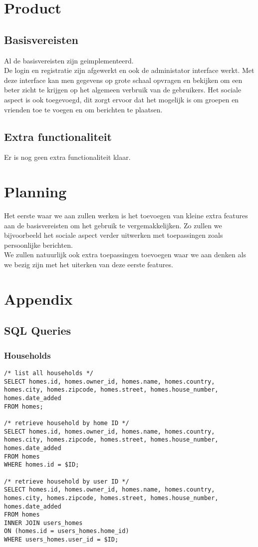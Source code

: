 \documentclass[11pt]{article}
\begin{document}
\section{Product}
  \subsection{Basisvereisten}
  Al de basisvereisten zijn geimplementeerd.\\
  De login en registratie zijn afgewerkt en ook de administator interface werkt. Met deze interface
  kan men gegevens op grote schaal opvragen en bekijken om een beter zicht te krijgen op het
  algemeen verbruik van de gebruikers. Het sociale aspect is ook toegevoegd, dit zorgt ervoor dat
  het mogelijk is om groepen en vrienden toe te voegen en om berichten te plaatsen.
  \subsection{Extra functionaliteit}
  Er is nog geen extra functionaliteit klaar.
\section{Planning}
Het eerste waar we aan zullen werken is het toevoegen van kleine extra features aan de
basisvereisten om het gebruik te vergemakkelijken. Zo zullen we bijvoorbeeld het sociale aspect
verder uitwerken met toepassingen zoals persoonlijke berichten.\\
We zullen natuurlijk ook extra toepassingen toevoegen waar we aan denken als we bezig zijn
met het uiterken van deze eerste features.
\section{Appendix}
  \subsection{SQL Queries}
  \subsubsection{Households}
\begin{lstlisting}[style=SQL]
/* list all households */
SELECT homes.id, homes.owner_id, homes.name, homes.country, homes.city, homes.zipcode, homes.street, homes.house_number, homes.date_added
FROM homes;

/* retrieve household by home ID */
SELECT homes.id, homes.owner_id, homes.name, homes.country, homes.city, homes.zipcode, homes.street, homes.house_number, homes.date_added
FROM homes
WHERE homes.id = $ID;

/* retrieve household by user ID */
SELECT homes.id, homes.owner_id, homes.name, homes.country, homes.city, homes.zipcode, homes.street, homes.house_number, homes.date_added
FROM homes
INNER JOIN users_homes
ON (homes.id = users_homes.home_id)
WHERE users_homes.user_id = $ID;
\end{lstlisting}
\end{document}
